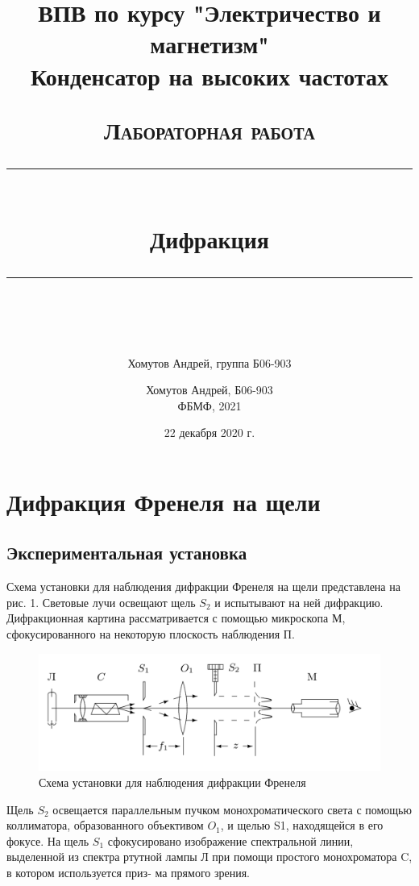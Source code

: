\documentclass[a4paper, 12pt]{article}
\author{Хомутов Андрей, группа Б06-903}
\title{ВПВ по курсу "Электричество и магнетизм" \\ Конденсатор на высоких частотах}
\date{22 декабря 2020 г.}
\newcommand{\HRule}[1]{\rule{\linewidth}{#1}}
\begin{document}
\title{ \normalsize \textsc{Лабораторная работа}
		\\ [4.0cm]
		\HRule{0.5pt} \\ [0.3cm]
		\LARGE \textbf{{Дифракция}}
		\HRule{0.5pt} \\ [0.1cm]
		\normalsize  \vspace*{18\baselineskip}}

\date{}

\author{%
		Хомутов Андрей, Б06-903 \\
ФБМФ, 2021\\ }

\maketitle
\thispagestyle{empty}
\newpage
\section{Дифракция Френеля на щели}
	
\subsection{Экспериментальная установка}
	
	Схема установки для наблюдения дифракции Френеля на щели
представлена на рис. 1. Световые лучи освещают щель $ S_2 $ и испытывают на ней дифракцию. Дифракционная картина рассматривается с помощью микроскопа М, сфокусированного на некоторую плоскость наблюдения П.
	
	\begin{figure}[h!]
		\centering
		\includegraphics[width=0.8\linewidth]{a.png}
		\caption{Схема установки для наблюдения дифракции Френеля}
		\label{labA}
	\end{figure}

Щель $ S_2 $ освещается параллельным пучком монохроматического
света с помощью коллиматора, образованного объективом $ O_1 $, и щелью S1, находящейся в его фокусе. На щель $ S_1 $ сфокусировано изображение спектральной линии, выделенной из спектра ртутной лампы Л при помощи простого монохроматора C, в котором используется приз-
ма прямого зрения.
\end{document}
